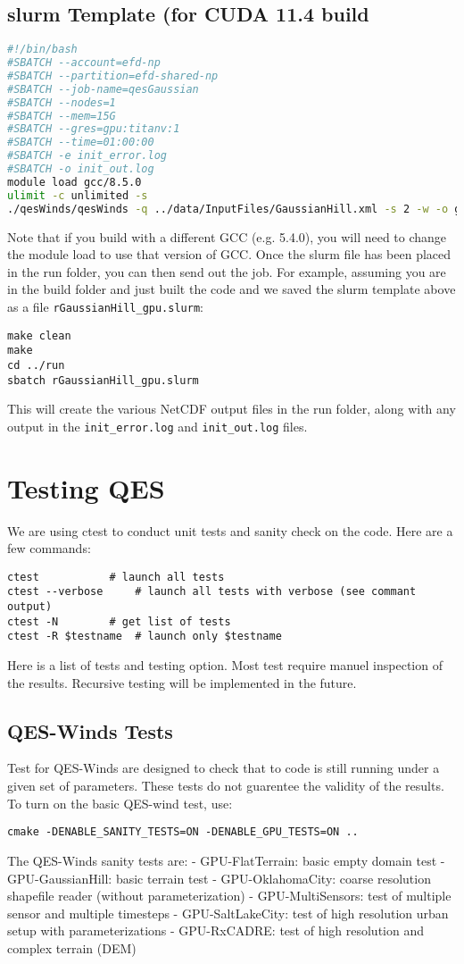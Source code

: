\subsection{slurm Template (for CUDA 11.4 build}
\begin{lstlisting}[language=bash]
#!/bin/bash
#SBATCH --account=efd-np
#SBATCH --partition=efd-shared-np
#SBATCH --job-name=qesGaussian
#SBATCH --nodes=1
#SBATCH --mem=15G
#SBATCH --gres=gpu:titanv:1
#SBATCH --time=01:00:00
#SBATCH -e init_error.log
#SBATCH -o init_out.log
module load gcc/8.5.0
ulimit -c unlimited -s
./qesWinds/qesWinds -q ../data/InputFiles/GaussianHill.xml -s 2 -w -o gaussianHill
\end{lstlisting}

Note that if you build with a different GCC (e.g. 5.4.0), you will need to change the module load to use that version of GCC. Once the slurm file has been placed in the run folder, you can then send out the job.  For example, assuming you are in the build folder and just built the code and we saved the slurm template above as a file \verb|rGaussianHill_gpu.slurm|:

\begin{verbatim}
make clean
make
cd ../run
sbatch rGaussianHill_gpu.slurm
\end{verbatim}

This will create the various NetCDF output files in the run folder, along with any output in the \verb|init_error.log| and \verb|init_out.log| files.


\section{Testing QES}

We are using ctest to conduct unit tests and sanity check on the code. Here are a few commands:
\begin{verbatim}
ctest			# launch all tests
ctest --verbose		# launch all tests with verbose (see commant output)
ctest -N		# get list of tests
ctest -R $testname	# launch only $testname
\end{verbatim}
Here is a list of tests and testing option. Most test require manuel inspection of the results. Recursive testing will be implemented in the future.

\subsection{QES-Winds Tests}

Test for QES-Winds are designed to check that to code is still running under a given set of parameters. These tests do not guarentee the validity of the results. To turn on the basic QES-wind test, use:
\begin{verbatim}
cmake -DENABLE_SANITY_TESTS=ON -DENABLE_GPU_TESTS=ON ..
\end{verbatim}
The QES-Winds sanity tests are:
- GPU-FlatTerrain: basic empty domain test
- GPU-GaussianHill: basic terrain test
- GPU-OklahomaCity: coarse resolution shapefile reader (without parameterization)
- GPU-MultiSensors: test of multiple sensor and multiple timesteps
- GPU-SaltLakeCity: test of high resolution urban setup with parameterizations
- GPU-RxCADRE: test of high resolution and complex terrain (DEM)

